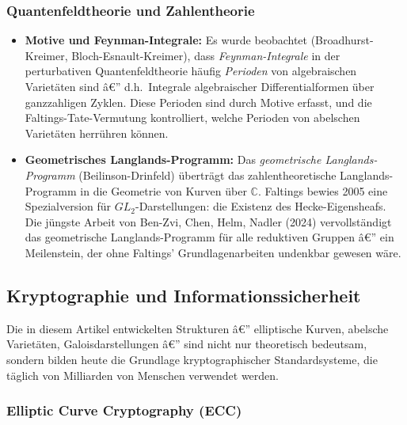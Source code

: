 ﻿\documentclass[12pt,a4paper]{article}
\theoremstyle{plain}
\theoremstyle{definition}
\theoremstyle{remark}
\newcommand{\C}{\mathbb{C}}
\begin{document}
\subsubsection{Quantenfeldtheorie und Zahlentheorie}

\begin{itemize}[leftmargin=2em,itemsep=4pt]
  \item \textbf{Motive und Feynman-Integrale:}
    Es wurde beobachtet (Broadhurst-Kreimer, Bloch-Esnault-Kreimer), dass
    \emph{Feynman-Integrale} in der perturbativen Quantenfeldtheorie häufig
    \emph{Perioden} von algebraischen Varietäten sind â€” d.h.\ Integrale
    algebraischer Differentialformen über ganzzahligen Zyklen.
    Diese Perioden sind durch Motive erfasst, und die Faltings-Tate-Vermutung
    kontrolliert, welche Perioden von abelschen Varietäten herrühren können.

  \item \textbf{Geometrisches Langlands-Programm:}
    Das \emph{geometrische Langlands-Programm} (Beilinson-Drinfeld) überträgt das
    zahlentheoretische Langlands-Programm in die Geometrie von Kurven über $\C$.
    Faltings bewies 2005 eine Spezialversion für $GL_2$-Darstellungen:
    die Existenz des Hecke-Eigensheafs.
    Die jüngste Arbeit von Ben-Zvi, Chen, Helm, Nadler (2024) vervollständigt
    das geometrische Langlands-Programm für alle reduktiven Gruppen â€”
    ein Meilenstein, der ohne Faltings' Grundlagenarbeiten undenkbar gewesen wäre.
\end{itemize}

\subsection{Kryptographie und Informationssicherheit}

Die in diesem Artikel entwickelten Strukturen â€” elliptische Kurven, abelsche Varietäten,
Galoisdarstellungen â€” sind nicht nur theoretisch bedeutsam, sondern bilden heute
die Grundlage kryptographischer Standardsysteme, die täglich von Milliarden von
Menschen verwendet werden.

\subsubsection{Elliptic Curve Cryptography (ECC)}
\end{document}
